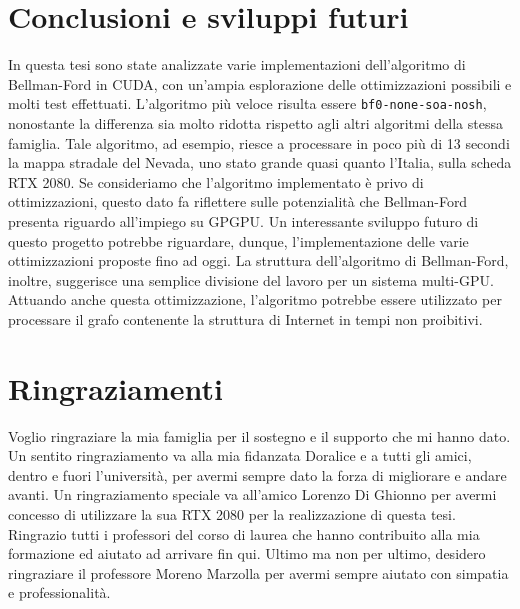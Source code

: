 \documentclass[12pt,a4paper,oneside]{book}
\begin{document}
	\chapter*{Conclusioni e sviluppi futuri}
	In questa tesi sono state analizzate varie implementazioni dell'algoritmo di Bellman-Ford in CUDA, con un'ampia esplorazione delle ottimizzazioni possibili e molti test effettuati. L'algoritmo più veloce risulta essere \texttt{bf0-none-soa-nosh}, nonostante la differenza sia molto ridotta rispetto agli altri algoritmi della stessa famiglia. Tale algoritmo, ad esempio, riesce a processare in poco più di 13 secondi la mappa stradale del Nevada, uno stato grande quasi quanto l'Italia, sulla scheda RTX 2080. Se consideriamo che l'algoritmo implementato è privo di ottimizzazioni, questo dato fa riflettere sulle potenzialità che Bellman-Ford presenta riguardo all'impiego su GPGPU. Un interessante sviluppo futuro di questo progetto potrebbe riguardare, dunque, l'implementazione delle varie ottimizzazioni proposte fino ad oggi. La struttura dell'algoritmo di Bellman-Ford, inoltre, suggerisce una semplice divisione del lavoro per un sistema multi-GPU. Attuando anche questa ottimizzazione, l'algoritmo potrebbe essere utilizzato per processare il grafo contenente la struttura di Internet in tempi non proibitivi.
	
	\printbibliography
	
	\chapter*{Ringraziamenti}
	Voglio ringraziare la mia famiglia per il sostegno e il supporto che mi hanno dato. Un sentito ringraziamento va alla mia fidanzata Doralice e a tutti gli amici, dentro e fuori l'università, per avermi sempre dato la forza di migliorare e andare avanti. Un ringraziamento speciale va all'amico Lorenzo Di Ghionno per avermi concesso di utilizzare la sua RTX 2080 per la realizzazione di questa tesi. Ringrazio tutti i professori del corso di laurea che hanno contribuito alla mia formazione ed aiutato ad arrivare fin qui. Ultimo ma non per ultimo, desidero ringraziare il professore Moreno Marzolla per avermi sempre aiutato con simpatia e professionalità.
	
\end{document}
